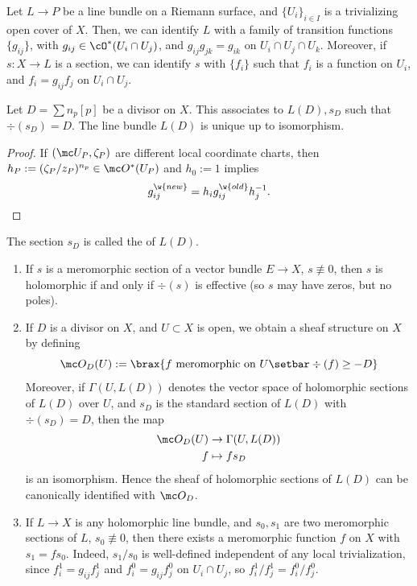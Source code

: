 \documentclass[11pt]{report}
\begin{document}
\begin{notebox*}[Overview]
    Let $L \to P$ be a line bundle on a Riemann surface, and $\{U_i\}_{i \in I}$ is a trivializing open cover of $X$. Then, we can identify $L$ with a family of transition functions $\{g_{ij}\}$, with $g_{ij} \in \cO^*(U_i \cap U_j)$, and $g_{ij}g_{jk}=g_{ik}$ on $U_i \cap U_j \cap U_k$. Moreover, if $s:X \to L$ is a section, we can identify $s$ with $\{f_{i}\}$ such that $f_i$ is a function on $U_i$, and $f_i = g_{ij}f_j$ on $U_i \cap U_j$.
\end{notebox*}

\begin{rmk}
    Let $D = \sum n_p[p]$ be a divisor on $X$. This associates to $L(D),s_D$ such that $\div(s_D)=D$. The line bundle $L(D)$ is unique up to isomorphism.
\end{rmk}

\begin{proof}
    If $(\mc U_P,\zeta_P)$ are different local coordinate charts, then $h_P:=(\zeta_P/z_P)^{n_p}\in \mc O^*(U_P)$ and $h_0:=1$ implies
    \[
    g_{ij}^{\w{new}}=h_ig_{ij}^{\w{old}}h_j^{-1}.
    \]
\end{proof}

\begin{defn}
    The section $s_D$ is called the  of $L(D)$.
\end{defn}

\begin{rmk}[][label=rmk:sheaf-on-divisor]
    \begin{enumerate}
        \item If $s$ is a meromorphic section of a vector bundle $E \to X$, $s \not \equiv 0$, then $s$ is holomorphic if and only if $\div(s)$ is effective (so $s$ may have zeros, but no poles).
        \item If $D$ is a divisor on $X$, and $U \subset X$ is open, we obtain a sheaf structure  on $X$ by defining \[
        \mc O_D(U):=\brax{ f \text{ meromorphic on } U \setbar \div(f) \geq -D   }
        \] Moreover, if $\Gamma(U,L(D))$ denotes the vector space of holomorphic sections of $L(D)$ over $U$, and $s_D$ is the standard section of $L(D)$ with $\div(s_D)=D$, then the map \begin{align*}
            \mc O_D(U) &\to \Gamma(U,L(D)) \\ f &\mapsto fs_D
        \end{align*}
        is an isomorphism. Hence the sheaf of holomorphic sections of $L(D)$ can be canonically identified with $\mc O_D$.
        \item If $L \to X$ is any holomorphic line bundle, and $s_0,s_1$ are two meromorphic sections of $L$, $s_0 \not \equiv 0$, then there exists a meromorphic function $f$ on $X$ with $s_1 =f s_0$. Indeed, $s_1/s_0$ is well-defined independent of any local trivialization, since $f_i^1 = g_{ij}f_j^1$ and $f_i^0=g_{ij}f_{j}^0$ on $U_i \cap U_j$, so $f_i^1/f_j^1 = f_i^0/f_j^0$.
    \end{enumerate}
\end{rmk}
\end{document}
